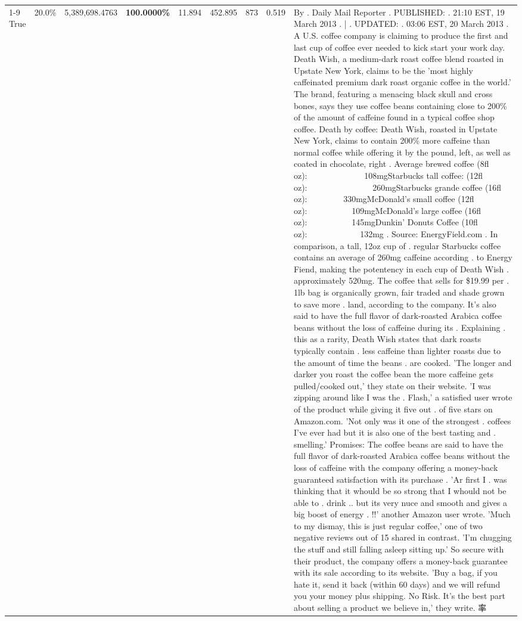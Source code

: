 \begin{table}[H]
{\begin{tabular}{lllrlllll}
\cline{1-9}
True & 20.0\% & 5,389,698.4763 & \bfseries \color{red} 100.0000\% & 11.894 & 452.895 & 873 & 0.519 & By . Daily Mail Reporter . PUBLISHED: . 21:10 EST, 19 March 2013 . | . UPDATED: . 03:06 EST, 20 March 2013 . A U.S. coffee company is claiming to produce the first and last cup of coffee ever needed to kick start your work day. Death Wish, a medium-dark roast coffee blend roasted in Upstate New York, claims to be the 'most highly caffeinated premium dark roast organic coffee in the world.' The brand, featuring a menacing black skull and cross bones, says they use coffee beans containing close to 200\% of the amount of caffeine found in a typical coffee shop coffee. Death by coffee: Death Wish, roasted in Upstate New York, claims to contain 200\% more caffeine than normal coffee while offering it by the pound, left, as well as coated in chocolate, right . Average brewed coffee (8fl oz):              108mgStarbucks tall coffee: (12fl oz):                260mgStarbucks grande coffee (16fl oz):         330mgMcDonald's small coffee (12fl oz):           109mgMcDonald's large coffee (16fl oz):           145mgDunkin' Donuts Coffee (10fl oz):             132mg . Source: EnergyField.com . In comparison, a tall, 12oz cup of . regular Starbucks coffee contains an average of 260mg caffeine according . to Energy Fiend, making the potentency in each cup of Death Wish . approximately 520mg. The coffee that sells for \$19.99 per . 1lb bag is organically grown, fair traded and shade grown to save more . land, according to the company. It's also said to have the full flavor of dark-roasted Arabica coffee beans without the loss of caffeine during its . Explaining . this as a rarity, Death Wish states that dark roasts typically contain . less caffeine than lighter roasts due to the amount of time the beans . are cooked. 'The longer and darker you roast the coffee bean the more caffeine gets pulled/cooked out,' they state on their website. 'I was zipping around like I was the . Flash,' a satisfied user wrote of the product while giving it five out . of five stars on Amazon.com. 'Not only was it one of the strongest . coffees I've ever had but it is also one of the best tasting and . smelling.’ Promises: The coffee beans are said to have the full flavor of dark-roasted Arabica coffee beans without the loss of caffeine with the company offering a money-back guaranteed satisfaction with its purchase . 'Ar first I . was thinking that it whould be so strong that I whould not be able to . drink .. but its very nuce and smooth and gives a big boost of energy . !!' another Amazon user wrote. 'Much to my dismay, this is just regular coffee,' one of two negative reviews out of 15 shared in contrast. 'I'm chugging the stuff and still falling asleep sitting up.' So secure with their product, the company offers a money-back guarantee with its sale according to its website. 'Buy a bag, if you hate it, send it back (within 60 days) and we will refund you your money plus shipping. No Risk. It’s the best part about selling a product we believe in,' they write. 率 \\

\end{tabular}}
\end{table}
